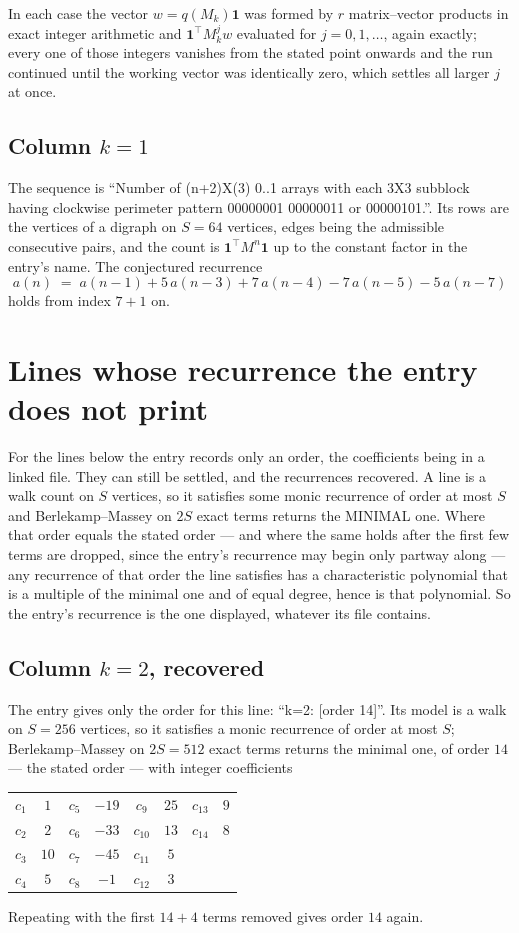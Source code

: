 \documentclass[11pt,a4paper]{article}
\theoremstyle{plain}
\theoremstyle{definition}
\begin{document}
In each case the vector $w=q(M_k)\mathbf{1}$ was formed by $r$ matrix--vector products in
exact integer arithmetic and $\mathbf{1}^{\!\top}M_k^{j}w$ evaluated for $j=0,1,\dots$,
again exactly; every one of those integers vanishes from the stated point onwards and the run
continued until the working vector was identically zero, which settles all larger $j$ at once.

\subsection*{Column $k$$=1$}
The sequence is ``Number of (n+2)X(3) 0..1 arrays with each 3X3 subblock having clockwise perimeter pattern 00000001 00000011 or 00000101.''. Its rows are the vertices of a digraph on
$S=64$ vertices, edges being the admissible consecutive pairs, and the count is
$\mathbf{1}^{\!\top}M^{n}\mathbf{1}$ up to the constant factor in the entry's name.
The conjectured recurrence
\[
a(n)\;=\;a(n-1) + 5\,a(n-3) + 7\,a(n-4) - 7\,a(n-5) - 5\,a(n-7)
\]
holds from index $7+1$ on.


\section{Lines whose recurrence the entry does not print}

For the lines below the entry records only an order, the coefficients being in a linked file.
They can still be settled, and the recurrences recovered. A line is a walk count on $S$
vertices, so it satisfies some monic recurrence of order at most $S$ and Berlekamp--Massey on
$2S$ exact terms returns the MINIMAL one. Where that order equals the stated order --- and
where the same holds after the first few terms are dropped, since the entry's recurrence may
begin only partway along --- any recurrence of that order the line satisfies has a
characteristic polynomial that is a multiple of the minimal one and of equal degree, hence is
that polynomial. So the entry's recurrence is the one displayed, whatever its file contains.

\subsection*{Column $k=2$, recovered}
The entry gives only the order for this line: ``k=2: [order 14]''. Its model is a walk on
$S=256$ vertices, so it satisfies a monic recurrence of order at most $S$;
Berlekamp--Massey on $2S=512$ exact terms returns the minimal one, of order
$14$ --- the stated order --- with integer coefficients
\begin{center}\small\begin{tabular}{cccccccc}
$c_{1}$ & $1$ & $c_{5}$ & $-19$ & $c_{9}$ & $25$ & $c_{13}$ & $9$ \\
$c_{2}$ & $2$ & $c_{6}$ & $-33$ & $c_{10}$ & $13$ & $c_{14}$ & $8$ \\
$c_{3}$ & $10$ & $c_{7}$ & $-45$ & $c_{11}$ & $5$ &  &  \\
$c_{4}$ & $5$ & $c_{8}$ & $-1$ & $c_{12}$ & $3$ &  &  \\
\end{tabular}\end{center}
Repeating with the first $14+4$ terms removed gives order $14$ again.
\end{document}
